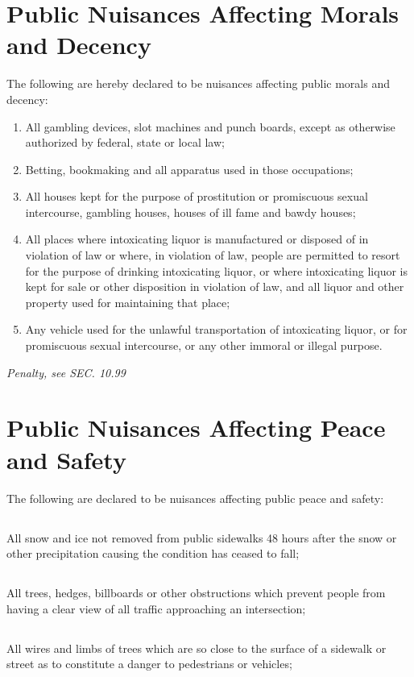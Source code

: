 \section{Public Nuisances Affecting Morals and Decency}
The following are hereby declared to be nuisances affecting public morals and decency:
\begin{enumerate}[{\indent}A)]
    \item All gambling devices, slot machines and punch boards, except as otherwise authorized by federal, state or local law;
    \item Betting, bookmaking and all apparatus used in those occupations;
    \item All houses kept for the purpose of prostitution or promiscuous sexual intercourse, gambling houses, houses of ill fame and bawdy houses;
    \item All places where intoxicating liquor is manufactured or disposed of in violation of law or where, in violation of law, people are permitted to resort for the purpose of drinking intoxicating liquor, or where intoxicating liquor is kept for sale or other disposition in violation of law, and all liquor and other property used for maintaining that place;
    \item Any vehicle used for the unlawful transportation of intoxicating liquor, or for promiscuous sexual intercourse, or any other immoral or illegal purpose.
\end{enumerate}
\emph{Penalty, see SEC. 10.99}
\section{Public Nuisances Affecting Peace and Safety}
The following are declared to be nuisances affecting public peace and safety:
\subsection{}
All snow and ice not removed from public sidewalks 48 hours after the snow or other precipitation causing the condition has ceased to fall;
\subsection{}
All trees, hedges, billboards or other obstructions which prevent people from having a clear view of all traffic approaching an intersection;
\subsection{}
All wires and limbs of trees which are so close to the surface of a sidewalk or street as to constitute a danger to pedestrians or vehicles;
